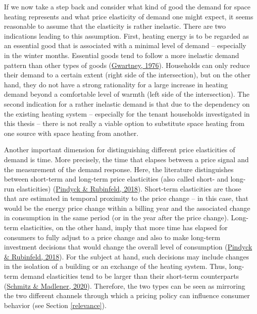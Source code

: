 \documentclass[12pt,twoside]{reedthesis}
\begin{document}
If we now take a step back and consider what kind of good the demand for space heating represents and what price elasticity of demand one might expect, it seems reasonable to assume that the elasticity is rather inelastic. There are two indications leading to this assumption. First, heating energy is to be regarded as an essential good that is associated with a minimal level of demand -- especially in the winter months. Essential goods tend to follow a more inelastic demand pattern than other types of goods (\protect\hyperlink{ref-gwartney76}{Gwartney, 1976}). Households can only reduce their demand to a certain extent (right side of the intersection), but on the other hand, they do not have a strong rationality for a large increase in heating demand beyond a comfortable level of warmth (left side of the intersection). The second indication for a rather inelastic demand is that due to the dependency on the existing heating system -- especially for the tenant households investigated in this thesis -- there is not really a viable option to substitute space heating from one source with space heating from another.

Another important dimension for distinguishing different price elasticities of demand is time. More precisely, the time that elapses between a price signal and the measurement of the demand response. Here, the literature distinguishes between short-term and long-term price elasticities (also called short- and long-run elasticities) (\protect\hyperlink{ref-pindyck_rubinfeld18}{Pindyck \& Rubinfeld, 2018}). Short-term elasticities are those that are estimated in temporal proximity to the price change -- in this case, that would be the energy price change within a billing year and the associated change in consumption in the same period (or in the year after the price change). Long-term elasticities, on the other hand, imply that more time has elapsed for consumers to fully adjust to a price change and also to make long-term investment decisions that would change the overall level of consumption (\protect\hyperlink{ref-pindyck_rubinfeld18}{Pindyck \& Rubinfeld, 2018}). For the subject at hand, such decisions may include changes in the isolation of a building or an exchange of the heating system. Thus, long-term demand elasticities tend to be larger than their short-term counterparts (\protect\hyperlink{ref-schmitz_madlener20}{Schmitz \& Madlener, 2020}). Therefore, the two types can be seen as mirroring the two different channels through which a pricing policy can influence consumer behavior (see Section \ref{relevance}).
\end{document}
